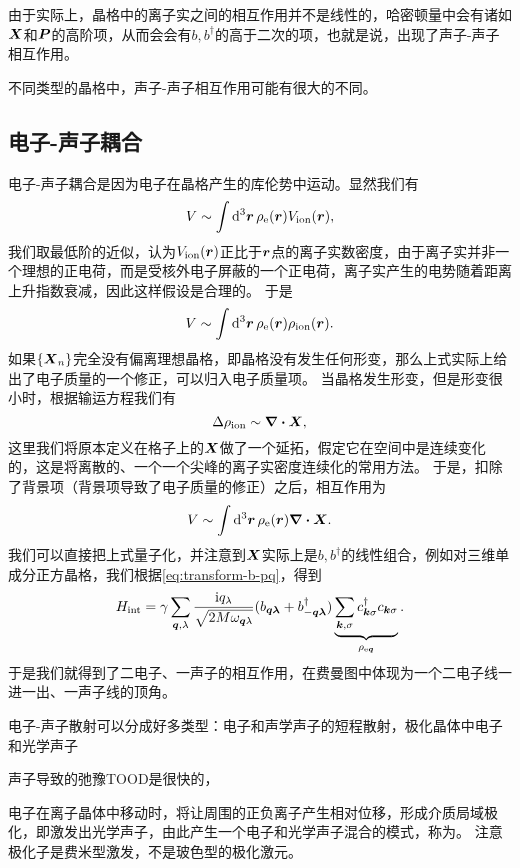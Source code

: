 由于实际上，晶格中的离子实之间的相互作用并不是线性的，哈密顿量中会有诸如$\vb*{X}$和$\vb*{P}$的高阶项，从而会会有${b}, {b}^\dagger$的高于二次的项，也就是说，出现了声子-声子相互作用。

不同类型的晶格中，声子-声子相互作用可能有很大的不同。

\subsection{电子-声子耦合}

电子-声子耦合是因为电子在晶格产生的库伦势中运动。显然我们有
\[
    V \sim \int \dd[3]{\vb*{r}} \rho_\text{e}(\vb*{r}) V_\text{ion}(\vb*{r}),
\]
我们取最低阶的近似，认为$V_\text{ion}(\vb*{r})$正比于$\vb*{r}$点的离子实数密度，由于离子实并非一个理想的正电荷，而是受核外电子屏蔽的一个正电荷，离子实产生的电势随着距离上升指数衰减，因此这样假设是合理的。
于是
\[
    V \sim \int \dd[3]{\vb*{r}} \rho_\text{e}(\vb*{r}) \rho_\text{ion}(\vb*{r}).
\]
如果$\{\vb*{X}_n\}$完全没有偏离理想晶格，即晶格没有发生任何形变，那么上式实际上给出了电子质量的一个修正，可以归入电子质量项。
当晶格发生形变，但是形变很小时，根据输运方程我们有
\[
    \Delta \rho_\text{ion} \sim \div{\vb*{X}},
\]
这里我们将原本定义在格子上的$\vb*{X}$做了一个延拓，假定它在空间中是连续变化的，这是将离散的、一个一个尖峰的离子实密度连续化的常用方法。
于是，扣除了背景项（背景项导致了电子质量的修正）之后，相互作用为
\[
    V \sim \int \dd[3]{\vb*{r}} \rho_\text{e}(\vb*{r}) \div{\vb*{X}}.
\]
我们可以直接把上式量子化，并注意到${\vb*{X}}$实际上是${b}, {b}^\dagger$的线性组合，例如对三维单成分正方晶格，我们根据\eqref{eq:transform-b-pq}，得到
\begin{equation}
    {H}_\text{int} = \gamma \sum_{\vb*{q}, \lambda} \frac{\mathrm{i} q_\lambda}{\sqrt{2 M \omega_{\vb*{q} \lambda}}} ({b}_{\vb*{q} \vb*{\lambda}} + {b}^\dagger_{-\vb*{q} \vb*{\lambda}}) \underbrace{\sum_{\vb*{k}, \sigma} {c}^\dagger_{\vb*{k} \sigma} {c}_{\vb*{k} \sigma}}_{{\rho}_{\text{e} \vb*{q}}}.
    \label{eq:simple-phonon-electron-int}
\end{equation}
于是我们就得到了二电子、一声子的相互作用，在费曼图中体现为一个二电子线一进一出、一声子线的顶角。

电子-声子散射可以分成好多类型：电子和声学声子的短程散射，极化晶体中电子和光学声子 %

声子导致的弛豫TOOD是很快的，

电子在离子晶体中移动时，将让周围的正负离子产生相对位移，形成介质局域极化，即激发出光学声子，由此产生一个电子和光学声子混合的模式，称为。
注意极化子是费米型激发，不是玻色型的极化激元。

